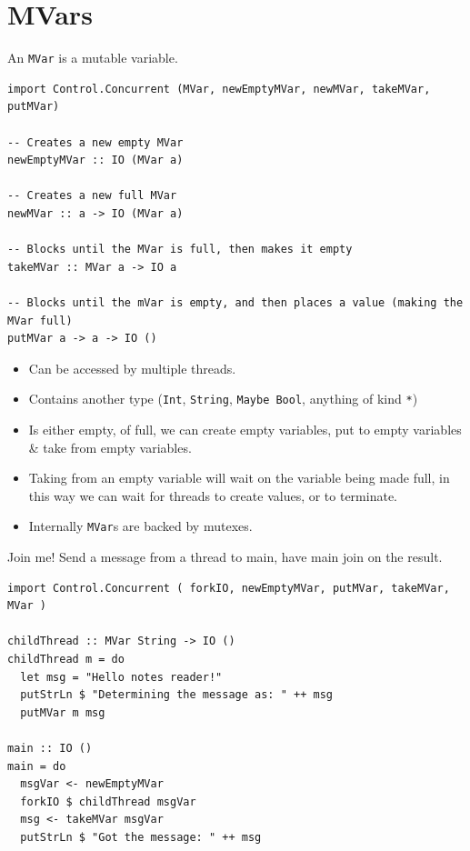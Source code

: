 \section{MVars}
An \texttt{MVar} is a mutable variable.
\begin{verbatim}
import Control.Concurrent (MVar, newEmptyMVar, newMVar, takeMVar, putMVar)

-- Creates a new empty MVar
newEmptyMVar :: IO (MVar a)

-- Creates a new full MVar
newMVar :: a -> IO (MVar a)

-- Blocks until the MVar is full, then makes it empty
takeMVar :: MVar a -> IO a

-- Blocks until the mVar is empty, and then places a value (making the MVar full)
putMVar a -> a -> IO ()
\end{verbatim}
\begin{itemize}
    \item Can be accessed by multiple threads.
    \item Contains another type (\texttt{Int}, \texttt{String}, \texttt{Maybe Bool}, anything of kind \texttt{*})
    \item Is either empty, of full, we can create empty variables, put to empty variables \& take from empty variables.
    \item Taking from an empty variable will wait on the variable being made full, in this way we can wait for threads to create values, or to terminate.
    \item Internally \texttt{MVar}s are backed by mutexes.
\end{itemize}

\begin{examplebox}{Join me!}
    Send a message from a thread to main, have main join on the result.
    \tcblower
    \begin{verbatim}
import Control.Concurrent ( forkIO, newEmptyMVar, putMVar, takeMVar, MVar )

childThread :: MVar String -> IO ()
childThread m = do
  let msg = "Hello notes reader!"
  putStrLn $ "Determining the message as: " ++ msg
  putMVar m msg

main :: IO ()
main = do
  msgVar <- newEmptyMVar
  forkIO $ childThread msgVar
  msg <- takeMVar msgVar
  putStrLn $ "Got the message: " ++ msg
    \end{verbatim}
\end{examplebox}

